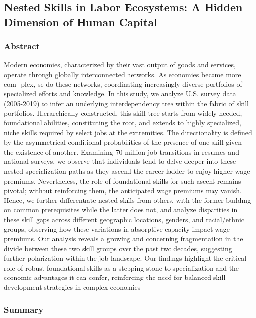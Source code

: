 \documentclass[12pt]{article}
\begin{document}
\subsection*{Nested Skills in Labor Ecosystems: A Hidden Dimension of Human Capital\cite{nested_skills}}

\subsubsection*{Abstract}

Modern economies, characterized by their vast output of goods and services, operate through globally interconnected networks. As economies become more com- plex, so do these networks, coordinating increasingly diverse portfolios of specialized efforts and knowledge. In this study, we analyze U.S. survey data (2005-2019) to infer an underlying interdependency tree within the fabric of skill portfolios. Hierarchically constructed, this skill tree starts from widely needed, foundational abilities, constituting the root, and extends to highly specialized, niche skills required by select jobs at the extremities. The directionality is defined by the asymmetrical conditional probabilities of the presence of one skill given the existence of another. Examining 70 million job transitions in resumes and national surveys, we observe that individuals tend to delve deeper into these nested specialization paths as they ascend the career ladder to enjoy higher wage premiums. Nevertheless, the role of foundational skills for such ascent remains pivotal; without reinforcing them, the anticipated wage premiums may vanish. Hence, we further differentiate nested skills from others, with the former building on common prerequisites while the latter does not, and analyze disparities in these skill gaps across different geographic locations, genders, and racial/ethnic groups, observing how these variations in absorptive capacity impact wage premiums. Our analysis reveals a growing and concerning fragmentation in the divide between these two skill groups over the past two decades, suggesting further polarization within the job landscape. Our findings highlight the critical role of robust foundational skills as a stepping stone to specialization and the economic advantages it can confer, reinforcing the need for balanced skill development strategies in complex economies

\subsubsection*{Summary}
\end{document}
